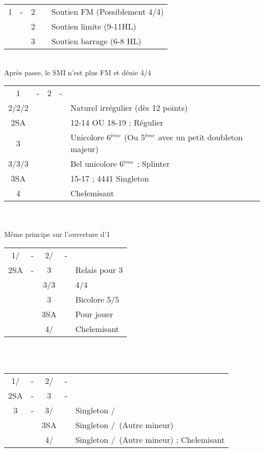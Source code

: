 \documentclass[a4paper, oneside, 11pt]{report}
\begin{document}
		\begin{tabular}{cccc|l}
		1\trefle & - & 2\trefle && Soutien FM (Possiblement 4\coeur/4\pique)\\	
		&& 2\carreau && Soutien limite (9-11HL)\\
		&& 3\trefle && Soutien barrage (6-8 HL)\\
		\end{tabular}\\
		Après passe, le SMI n'est plus FM et dénie 4\coeur/4\pique\\
	
		\begin{tabular}{cccc|l}
		1\trefle & - & 2\trefle & - &\\
		2\carreau/2\coeur/2\pique &&&& Naturel irrégulier (dès 12 points)\\
		2SA &&&& 12-14 OU 18-19 ; Régulier\\
		3\trefle &&&& Unicolore 6$^{ème}$ (Ou 5$^{ème}$ avec un petit doubleton majeur)\\
		3\carreau/3\coeur/3\pique &&&& Bel unicolore 6$^{ème}$ ; Splinter\\
		3SA &&&& 15-17 ; 4441 Singleton \carreau\\
		4\trefle &&&& Chelemisant \trefle\\
		\end{tabular}\\\\

		Même principe sur l'ouverture d'1\carreau\\

		\begin{tabular}{cccc|l}
		1\trefle/\carreau & - & 2\trefle/\carreau & - &\\
		2SA & - & 3\trefle && Relais pour 3\carreau\\
		&& 3\carreau/3\coeur && 4\coeur/4\pique\\
		&& 3\pique && Bicolore 5\trefle/5\carreau\\
		&& 3SA && Pour jouer\\
		&& 4\trefle/\carreau && Chelemisant\\
		\end{tabular}\\\\

		\begin{tabular}{cccc|l}
		1\trefle/\carreau & - & 2\trefle/\carreau & - &\\
		2SA & - & 3\trefle & - &\\
		3\carreau & - & 3\coeur/\pique && Singleton \coeur/\pique\\	
		&& 3SA && Singleton \carreau/\trefle\ (Autre mineur)\\
		&& 4\trefle/\carreau && Singleton \carreau/\trefle\ (Autre mineur) ; Chelemisant\\
		\end{tabular}\\\\
\end{document}
